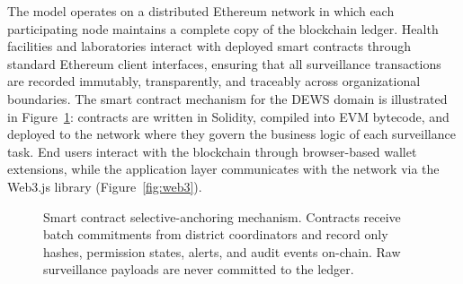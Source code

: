 \documentclass[AMA,LATO1COL]{WileyNJD-v2}
\begin{document}
The model operates on a distributed Ethereum network in which each participating node maintains a complete copy of the blockchain ledger. Health facilities and laboratories interact with deployed smart contracts through standard Ethereum client interfaces, ensuring that all surveillance transactions are recorded immutably, transparently, and traceably across organizational boundaries. The smart contract mechanism for the DEWS domain is illustrated in Figure~\ref{fig:smartcontract}: contracts are written in Solidity, compiled into EVM bytecode, and deployed to the network where they govern the business logic of each surveillance task. End users interact with the blockchain through browser-based wallet extensions, while the application layer communicates with the network via the Web3.js library (Figure~\ref{fig:web3}).

\begin{figure}[!ht]
\centering
{}
\caption{Smart contract selective-anchoring mechanism. Contracts receive batch commitments from district coordinators and record only hashes, permission states, alerts, and audit events on-chain. Raw surveillance payloads are never committed to the ledger.}\label{fig:smartcontract}
\end{figure}
%
%
%
%
%
%
\end{document}
